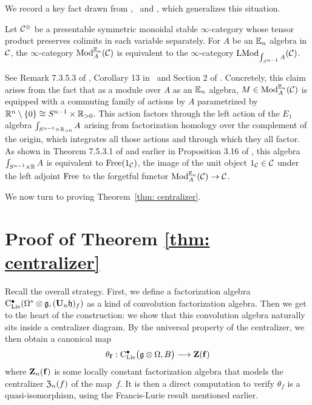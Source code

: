 \documentclass[11pt]{amsart}
\numberwithin{equation}{section}
\begin{document}
We record a key fact drawn from \cite{LurieHA},~\cite{FrancisHH}  and \cite{GG-Notes}, which generalizes this situation.

\begin{prp}
\label{P:ModentoModSn}
Let $\mathcal C^\otimes$ be a presentable symmetric monoidal stable $\infty$-category whose tensor product preserves colimits in each variable separately.
For $A$ be an $\mathbb E_n$ algebra in $\mathcal C$,
the $\infty$-category ${\rm Mod}^{\mathbb E_n}_A(\mathcal C)$ is equivalent to the $\infty$-category ${\rm LMod}_{{\int_{S^{n-1}} A}}(\mathcal C)$.
\end{prp}

See Remark 7.3.5.3 of \cite{LurieHA}, Corollary 13 in~\cite{GG-Notes} and Section 2 of \cite{FrancisHH}.
Concretely, this claim arises from the fact that as a module over $A$ as an $\mathbb E_n$ algebra, 
$M \in {\rm Mod}^{\mathbb E_n}_A(\mathcal C)$ is equipped with a commuting family of actions by $A$ parametrized by $\mathbb R^n \setminus \{0\}\cong S^{n-1} \times \mathbb R_{>0}$.
This action factors through the left action of the $E_1$ algebra $\int_{S^{n-1} \times \mathbb R_{>0}} A$ arising from factorization homology over the complement of the origin,
which integrates all those actions and through which they all factor. 
As shown in Theorem 7.5.3.1 of \cite{LurieHA} and earlier in Proposition 3.16 of \cite{FrancisHH}, 
this algebra $\int_{S^{n-1} \times \mathbb R} A$ is equivalent to ${\rm Free}(1_\mathcal C)$, 
the image of the unit object $1_\mathcal C \in \mathcal C$ under the left adjoint ${\rm Free}$ to the forgetful functor ${\rm Mod}^{\mathbb E_n}_A(\mathcal C) \to \mathcal C$.

We now turn to proving Theorem~\ref{thm: centralizer}.

\section{Proof of Theorem \ref{thm: centralizer}}

Recall the overall strategy.
First, we define a factorization algebra ${\rm C}_{\rm Lie}^\bullet(\Omega^* \otimes \mathfrak g, (\mathbf U_n \mathfrak h)_f)$ as a kind of convolution factorization algebra.
Then we get to the heart of the construction:
we show that this convolution algebra naturally sits inside a centralizer diagram.
By the universal property of the centralizer, we then obtain 
a canonical map 
\[
\theta_{{\bf f}}: {\rm C}_{\rm Lie}^\bullet\big(\mathfrak g\otimes \Omega , B \big) \longrightarrow  \mathbf Z(\mathbf{f})
\]
where $\mathbf Z_n(\mathbf{f})$ is some locally constant factorization algebra that models the centralizer ${\frak Z}_n(f)$ of the map~$f$.
It is then a direct computation to verify $\theta_f$ is a quasi-isomorphism,
using the Francis-Lurie result mentioned earlier.
\end{document}
